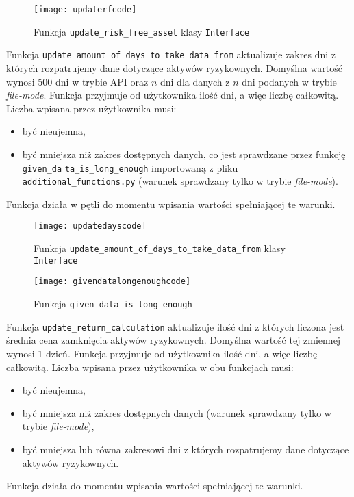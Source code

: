 \documentclass[magister]{dyplom}
\def\code#1{\texttt{#1}}
\begin{document}
\begin{figure}[ht]
	\centering
	\texttt{[image: updaterfcode]}
	\caption{Funkcja \code{update\_risk\_free\_asset} klasy \code{Interface}}
\end{figure}
\newpage
Funkcja \code{update\_amount\_of\_days\_to\_take\_data\_from} aktualizuje zakres dni z których rozpatrujemy dane dotyczące aktywów ryzykownych. Domyślna wartość wynosi 500 dni w trybie API oraz $n$ dni dla danych z $n$ dni podanych w trybie \textit{file-mode}. Funkcja przyjmuje od użytkownika ilość dni, a więc liczbę całkowitą. Liczba wpisana przez użytkownika musi:
\begin{itemize}
	\item być nieujemna,
	\item być mniejsza niż zakres dostępnych danych, co jest sprawdzane przez funkcję \code{given\_da} \code{ta\_is\_long\_enough} importowaną z pliku \code{additional\_functions.py} (warunek sprawdzany tylko w trybie \textit{file-mode}).
\end{itemize}
Funkcja działa w pętli do momentu wpisania wartości spełniającej te warunki.

\begin{figure}[ht]
	\centering
	\texttt{[image: updatedayscode]}
	\caption{Funkcja \code{update\_amount\_of\_days\_to\_take\_data\_from} klasy \code{Interface}}
\end{figure}

\begin{figure}[ht]
	\centering
	\texttt{[image: givendatalongenoughcode]}
	\caption{Funkcja \code{given\_data\_is\_long\_enough}}
\end{figure}

Funkcja \code{update\_return\_calculation} aktualizuje ilość dni z których liczona jest średnia cena zamknięcia aktywów ryzykownych. Domyślna wartość tej zmiennej wynosi 1 dzień. Funkcja przyjmuje od użytkownika ilość dni, a więc liczbę całkowitą. Liczba wpisana przez użytkownika w obu funkcjach musi:
\begin{itemize}
	\item być nieujemna,
	\item być mniejsza niż zakres dostępnych danych (warunek sprawdzany tylko w trybie \textit{file-mode}),
	\item być mniejsza lub równa zakresowi dni z których rozpatrujemy dane dotyczące aktywów ryzykownych.
\end{itemize}
Funkcja działa do momentu wpisania wartości spełniającej te warunki.
\end{document}
